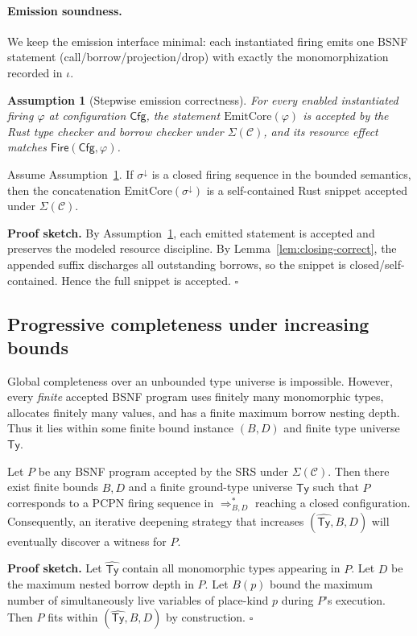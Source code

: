 \documentclass[runningheads]{llncs}
\newcommand{\Cfg}{\mathsf{Cfg}}
\newcommand{\Fire}{\mathsf{Fire}}
\newtheorem{assumption}{Assumption}
\begin{document}
\paragraph{Emission soundness.}
We keep the emission interface minimal: each instantiated firing emits one BSNF statement
(call/borrow/projection/drop) with exactly the monomorphization recorded in $\iota$.

\begin{assumption}[Stepwise emission correctness]
\label{ass:emit-stepwise}
For every enabled instantiated firing $\varphi$ at configuration $\Cfg$,
the statement $\mathrm{EmitCore}(\varphi)$ is accepted by the Rust type checker and borrow checker
under $\Sigma(\mathcal{C})$, and its resource effect matches $\Fire(\Cfg,\varphi)$.
\end{assumption}

\begin{theorem}
\label{thm:emit-sound}
Assume Assumption~\ref{ass:emit-stepwise}.
If $\sigma^{\downarrow}$ is a closed firing sequence in the bounded semantics,
then the concatenation $\mathrm{EmitCore}(\sigma^{\downarrow})$ is a self-contained Rust snippet
accepted under $\Sigma(\mathcal{C})$.
\end{theorem}
\noindent\textbf{Proof sketch.}
By Assumption~\ref{ass:emit-stepwise}, each emitted statement is accepted and preserves the modeled resource discipline.
By Lemma~\ref{lem:closing-correct}, the appended suffix discharges all outstanding borrows, so the snippet is closed/self-contained.
Hence the full snippet is accepted. \hfill $\square$

\subsection{Progressive completeness under increasing bounds}
\label{sec:analysis:progressive2}

Global completeness over an unbounded type universe is impossible.
However, every \emph{finite} accepted BSNF program uses finitely many monomorphic types,
allocates finitely many values, and has a finite maximum borrow nesting depth.
Thus it lies within some finite bound instance $(B,D)$ and finite type universe $\widehat{\mathsf{Ty}}$.

\begin{theorem}
\label{thm:limit-completeness}
Let $P$ be any BSNF program accepted by the SRS under $\Sigma(\mathcal{C})$.
Then there exist finite bounds $B,D$ and a finite ground-type universe $\widehat{\mathsf{Ty}}$
such that $P$ corresponds to a PCPN firing sequence in $\Rightarrow^{*}_{B,D}$ reaching a closed configuration.
Consequently, an iterative deepening strategy that increases $(\widehat{\mathsf{Ty}},B,D)$ will eventually discover a witness for $P$.
\end{theorem}
\noindent\textbf{Proof sketch.}
Let $\widehat{\mathsf{Ty}}$ contain all monomorphic types appearing in $P$.
Let $D$ be the maximum nested borrow depth in $P$.
Let $B(p)$ bound the maximum number of simultaneously live variables of place-kind $p$ during $P$'s execution.
Then $P$ fits within $(\widehat{\mathsf{Ty}},B,D)$ by construction. \hfill $\square$
\end{document}
